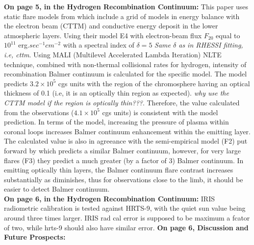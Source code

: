 \documentclass[11pt]{article}
\begin{document}
\textbf{On page 5, in the Hydrogen Recombination Continuum: } This paper uses static flare models from \cite{1983ApJ...272..739R} which include a grid of models in energy balance with the electron beam (CTTM) and conductive energy deposit in the lower atmospheric layers. Using their model E4 with electron-beam flux $F_{20}$ equal to $10^{11}$ erg.$sec^{-1}cm^{-2}$ with a spectral index of $\delta = 5$ \emph{Same $\delta$ as in RHESSI fitting, i.e, cttm}. Using MALI (Multilevel Accelerated Lambda Iteration) NLTE technique, combined with non-thermal collisional rates for hydrogen, intensity of recombination Balmer continuum is calculated for the specific model. The model predicts $3.2{\times}10^{5}$ cgs units with the region of the chromosphere having an optical thickness of 0.1 (i.e, it is an optically thin region as expected). \emph{why use the CTTM model if the region is optically thin???}. Therefore, the value calculated from the observations ($4.1{\times}10^{5}$ cgs units) is consistent with the model prediction. In terms of the model, increasing the pressure of plasma within coronal loops increases Balmer continuum enhancement within the emitting layer. The calculated value is also in agreeance with the semi-empirical model (F2) put forward by \cite{1986lasf.conf..216A} which predicts a similar Balmer continuum, however, for very large flares (F3) they predict a much greater (by a factor of 3) Balmer continuum. In emitting optically thin layers, the Balmer continuum flare contrast increases substantially as \mu diminishes, thus for observations close to the limb, it should be easier to detect Balmer continuum.  \\
\textbf{On page 6, in the Hydrogen Recombination Continuum: } IRIS radiometric calibration is tested against HRTS-9, with the quiet sun value being around three times larger. IRIS rad cal error is supposed to be maximum a fcator of two, while hrts-9 should also have similar error.
\textbf{On page 6, Discussion and Future Prospects: }


\label{Bibliography}
%
\end{document}
